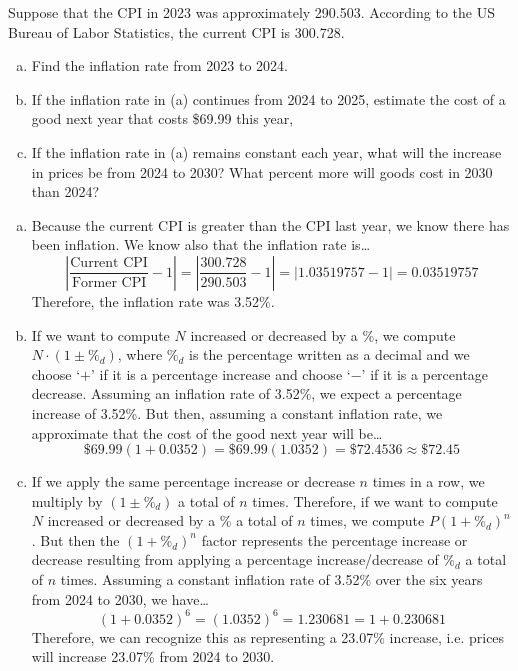 \documentclass[11pt,letterpaper]{article}
\begin{document}

 Suppose that the CPI in 2023 was approximately 290.503. According to the US Bureau of Labor Statistics, the current CPI is 300.728.
	\begin{enumerate}[(a)]
	\item Find the inflation rate from 2023 to 2024. 
	\item If the inflation rate in (a) continues from 2024 to 2025, estimate the cost of a good next year that costs \$69.99 this year,
	\item If the inflation rate in (a) remains constant each year, what will the increase in prices be from 2024 to 2030? What percent more will goods cost in 2030 than 2024?
	\end{enumerate} \pspace

\sol 
\begin{enumerate}[(a)]
\item Because the current CPI is greater than the CPI last year, we know there has been inflation. We know also that the inflation rate is\dots
	\[
	\left| \dfrac{\text{Current CPI}}{\text{Former CPI}} - 1 \right|= \left| \dfrac{300.728}{290.503} - 1 \right|= |1.03519757 - 1|= 0.03519757
	\]
Therefore, the inflation rate was 3.52\%. \pspace

\item If we want to compute $N$ increased or decreased by a \%, we compute $N \cdot (1 \pm \%_d)$, where $\%_d$ is the percentage written as a decimal and we choose `$+$' if it is a percentage increase and choose `$-$' if it is a percentage decrease. Assuming an inflation rate of 3.52\%, we expect a percentage increase of 3.52\%. But then, assuming a constant inflation rate, we approximate that the cost of the good next year will be\dots
	\[
	\$69.99 (1 + 0.0352)= \$69.99 (1.0352)= \$72.4536 \approx \$72.45
	\] \pspace

\item If we apply the same percentage increase or decrease $n$ times in a row, we multiply by $(1 \pm \%_d)$ a total of $n$ times. Therefore, if we want to compute $N$ increased or decreased by a \% a total of $n$ times, we compute $P(1 + \%_d)^n$. But then the $(1 + \%_d)^n$ factor represents the percentage increase or decrease resulting from applying a percentage increase/decrease of $\%_d$ a total of $n$ times. Assuming a constant inflation rate of 3.52\% over the six years from 2024 to 2030, we have\dots
	\[
	(1 + 0.0352)^6= (1.0352)^6= 1.230681= 1 + 0.230681
	\]
Therefore, we can recognize this as representing a 23.07\% increase, i.e. prices will increase 23.07\% from 2024 to 2030. 
\end{enumerate}
\end{document}
